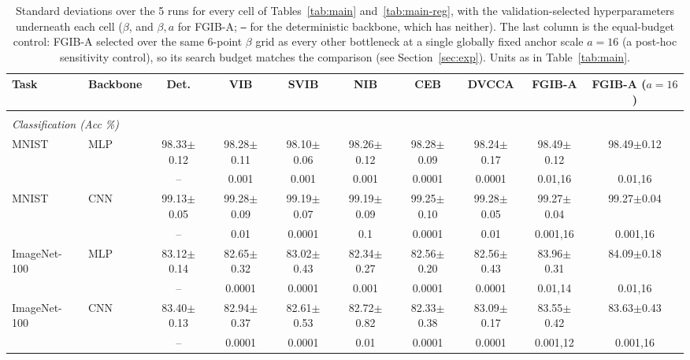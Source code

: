 \begin{table}[t]
\caption{Standard deviations over the 5 runs for every cell of Tables~\ref{tab:main} and~\ref{tab:main-reg}, with the validation-selected hyperparameters underneath each cell ($\beta$, and $\beta,a$ for FGIB-A; \texttt{--} for the deterministic backbone, which has neither). The last column is the equal-budget control: FGIB-A selected over the same 6-point $\beta$ grid as every other bottleneck at a single globally fixed anchor scale $a=16$ (a post-hoc sensitivity control), so its search budget matches the comparison (see Section~\ref{sec:exp}). Units as in Table~\ref{tab:main}.}
\label{tab:main-std}
\begin{center}\scriptsize
\begin{tabular}{llcccccccc}
Task & Backbone & Det. & VIB & SVIB & NIB & CEB & DVCCA & FGIB-A & FGIB-A ($a{=}16$) \\ \hline \\[-1.8ex]
\multicolumn{10}{l}{\emph{Classification (Acc \%)}} \\[0.3ex]
MNIST & MLP & 98.33$\pm$0.12 & 98.28$\pm$0.11 & 98.10$\pm$0.06 & 98.26$\pm$0.12 & 98.28$\pm$0.09 & 98.24$\pm$0.17 & 98.49$\pm$0.12 & 98.49$\pm$0.12 \\
 & & {\tiny --} & {\tiny 0.001} & {\tiny 0.001} & {\tiny 0.001} & {\tiny 0.0001} & {\tiny 0.0001} & {\tiny 0.01,16} & {\tiny 0.01,16} \\[0.4ex]
MNIST & CNN & 99.13$\pm$0.05 & 99.28$\pm$0.09 & 99.19$\pm$0.07 & 99.19$\pm$0.09 & 99.25$\pm$0.10 & 99.28$\pm$0.05 & 99.27$\pm$0.04 & 99.27$\pm$0.04 \\
 & & {\tiny --} & {\tiny 0.01} & {\tiny 0.0001} & {\tiny 0.1} & {\tiny 0.0001} & {\tiny 0.01} & {\tiny 0.001,16} & {\tiny 0.001,16} \\[0.4ex]
ImageNet-100 & MLP & 83.12$\pm$0.14 & 82.65$\pm$0.32 & 83.02$\pm$0.43 & 82.34$\pm$0.27 & 82.56$\pm$0.20 & 82.56$\pm$0.43 & 83.96$\pm$0.31 & 84.09$\pm$0.18 \\
 & & {\tiny --} & {\tiny 0.0001} & {\tiny 0.0001} & {\tiny 0.001} & {\tiny 0.0001} & {\tiny 0.0001} & {\tiny 0.01,14} & {\tiny 0.01,16} \\[0.4ex]
ImageNet-100 & CNN & 83.40$\pm$0.13 & 82.94$\pm$0.37 & 82.61$\pm$0.53 & 82.72$\pm$0.82 & 82.33$\pm$0.38 & 83.09$\pm$0.17 & 83.55$\pm$0.42 & 83.63$\pm$0.43 \\
 & & {\tiny --} & {\tiny 0.0001} & {\tiny 0.0001} & {\tiny 0.01} & {\tiny 0.0001} & {\tiny 0.0001} & {\tiny 0.001,12} & {\tiny 0.001,16} \\[0.4ex]

\end{tabular}
\end{center}
\end{table}
